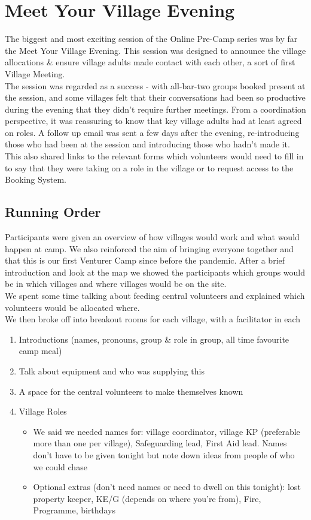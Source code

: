\section{Meet Your Village Evening}
The biggest and most exciting session of the Online Pre-Camp series was by far the Meet Your Village Evening. This session was designed to announce the village allocations \& ensure village adults made contact with each other, a sort of first Village Meeting.\\ 

The session was regarded as a success - with all-bar-two groups booked present at the session, and some villages felt that their conversations had been so productive during the evening that they didn't require further meetings. From a coordination perspective, it was reassuring to know that key village adults had at least agreed on roles.
A follow up email was sent a few days after the evening, re-introducing those who had been at the session and introducing those who hadn't made it. This also shared links to the relevant forms which volunteers would need to fill in to say that they were taking on a role in the village or to request access to the Booking System. 

\subsection{Running Order}
Participants were given an overview of how villages would work and what would happen at camp. We also reinforced the aim of bringing everyone together and that this is our first Venturer Camp since before the pandemic. After a brief introduction and look at the map we showed the participants which groups would be in which villages and where villages would be on the site.\\

We spent some time talking about feeding central volunteers and explained which volunteers would be allocated where.\\

We then broke off into breakout rooms for each village, with a facilitator in each
\begin{enumerate}
    \item Introductions (names, pronouns, group \& role in group, all time favourite camp meal)
    \item Talk about equipment and who was supplying this 
    \item A space for the central volunteers to make themselves known
    \item Village Roles
    \begin{itemize}
        \item We said we needed names for: village coordinator, village KP (preferable more than one per village), Safeguarding lead, First Aid lead. Names don't have to be given tonight but note down ideas from people of who we could chase
        \item Optional extras (don't need names or need to dwell on this tonight): lost property keeper, KE/G (depends on where you're from), Fire, Programme, birthdays
    \end{itemize}
\end{enumerate}

